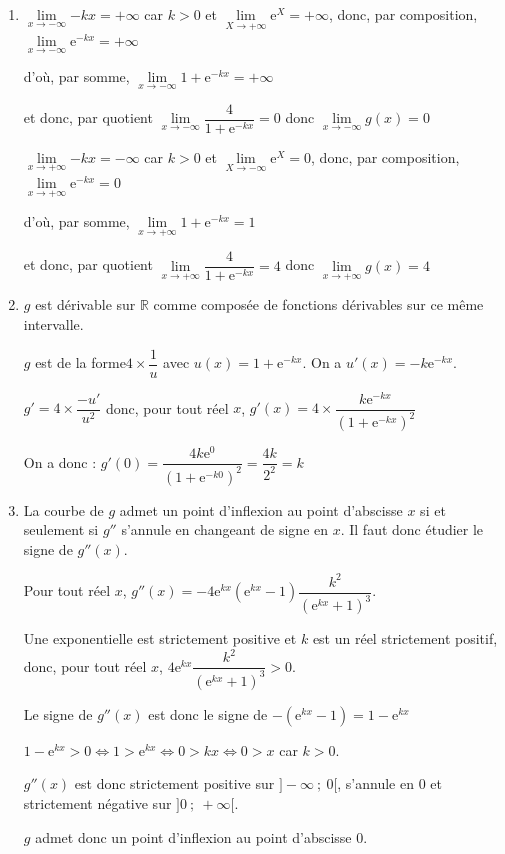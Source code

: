 \documentclass[10pt]{article}
\providecommand{\R}{\mathbb{R}}
\begin{document}
\begin{enumerate}
\item $\lim\limits_{x \to -\infty}{-kx}=+\infty$  car $k>0$ et $\lim\limits_{X\to +\infty}{\mathrm{e}^X}=+\infty$, donc, par composition, $\lim\limits_{x\to -\infty}{ \mathrm{e}^{-kx}}= +\infty$

d'où, par somme, $\lim\limits_{x\to -\infty} 1+ \mathrm{e}^{-kx}=+\infty$

et donc, par quotient $\lim\limits_{x\to -\infty}\dfrac{4}{1+\mathrm{e}^{-kx}}=0$ \hfill{donc  $\lim\limits_{x\to -\infty}g(x)=0$}


$\lim\limits_{x \to +\infty}{-kx}=-\infty$  car $k>0$ et $\lim\limits_{X\to -\infty}{\mathrm{e}^X}=0$, donc, par composition, $\lim\limits_{x\to +\infty}{ \mathrm{e}^{-kx}}=0$

	d'où, par somme, $\lim\limits_{x\to +\infty} 1+ \mathrm{e}^{-kx}=1$

	et donc, par quotient $\lim\limits_{x\to +\infty}\dfrac{4}{1+\mathrm{e}^{-kx}}=4$ \hfill donc  $\lim\limits_{x\to +\infty}g(x)=4$


\item  $g$ est dérivable sur $\R$ comme composée de fonctions dérivables sur ce même intervalle. 

$g$ est de la forme$4\times \dfrac{1}{u}$ avec $u(x)=1+\mathrm{e}^{-kx}$. On a $u'(x)=-k \mathrm{e}^{-kx}$.

$g'=4\times \dfrac{-u'}{u^2}$ donc, pour tout réel $x$,  $g'(x)=4\times \dfrac{k \mathrm{e}^{-kx}}{{\left(1+ \mathrm{e}^{-kx}\right)} ^2}$ 

On a donc : $g'(0)=\dfrac{4k\mathrm{e} ^0}{{\left( 1+ \mathrm{e}^{-k0}\right)} ^2} =\dfrac{4k}{2^2}=k$ 

\item  La courbe de $g$ admet un point d'inflexion au point d'abscisse $x$ si et seulement si $g''$ s'annule en changeant de signe en $x$.  Il faut donc étudier le signe de $g''(x)$. 

Pour tout réel $x$,  $g''(x)=-4 \mathrm{e}^{kx} \left( \mathrm{e}^{kx} -1 \right) \dfrac{k^2}{ { \left( \mathrm{e}^{kx}+1 \right)}^3}$. 

Une exponentielle est strictement positive  et $k$ est un réel strictement positif, donc, pour tout réel $x$,  $ 4\mathrm{e}^{kx} \dfrac{k^2}{ { \left( \mathrm{e}^{kx}+1 \right)}^3} >0$.

Le signe de $g''(x)$ est donc le signe de $-\left( \mathrm{e}^{kx} -1 \right)= 1-\mathrm{e}^{kx}$

$1-\mathrm{e}^{kx} > 0 \iff 1>\mathrm{e}^{kx} \iff 0>kx \iff 0>x$ car $k>0$.

$g''(x)$ est donc  strictement positive sur $]-\infty~;~ 0[$, s'annule en 0 et strictement négative sur $]0~;~+\infty[$.

$g$ admet donc un point d'inflexion au point d'abscisse 0.
\end{enumerate}

\bigskip
\end{document}
